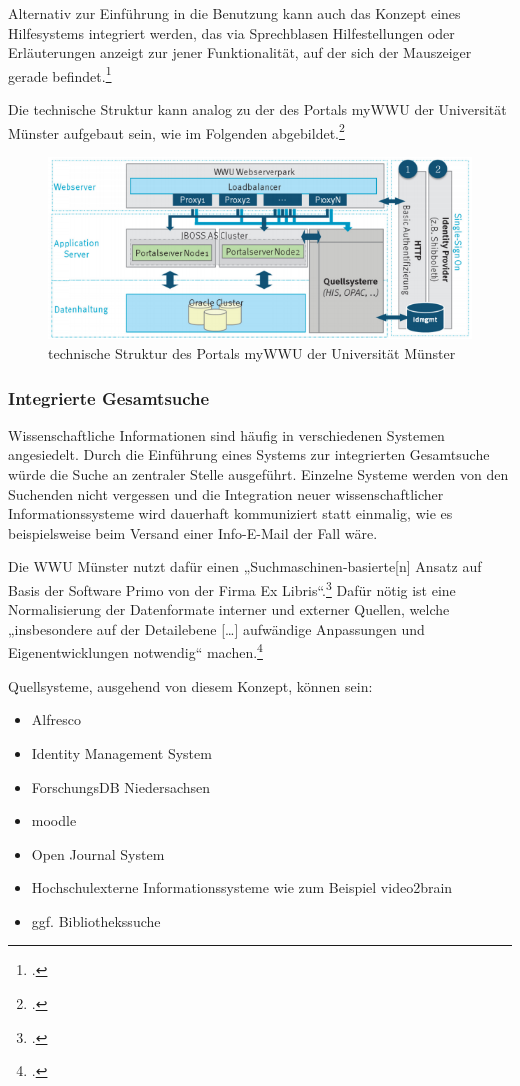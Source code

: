 Alternativ zur Einführung in die Benutzung kann auch das Konzept eines Hilfesystems integriert werden, das via Sprechblasen Hilfestellungen oder Erläuterungen anzeigt zur jener Funktionalität, auf der sich der Mauszeiger gerade befindet.\footcite[Vgl.][22]{vogl_bericht_2013}

Die technische Struktur kann analog zu der des Portals myWWU der Universität Münster aufgebaut sein, wie im Folgenden abgebildet.\footcite[Vgl.][165]{vogl_fortschritte_2012}
\begin{figure}[h!]
	\centering
	\includegraphics[width=\textwidth]{kapitel/gruppe3/bilder/struktur_mywwu}
	\caption{technische Struktur des Portals myWWU der Universität Münster}
	\label{fig_struktur_mywwu}
\end{figure}
\newpage

\subsubsection{Integrierte Gesamtsuche}
\label{subsubsection_integrierte_gesamtsuche}
Wissenschaftliche Informationen sind häufig in verschiedenen Systemen angesiedelt. Durch die Einführung eines Systems zur integrierten Gesamtsuche würde die Suche an zentraler Stelle ausgeführt. Einzelne Systeme werden von den Suchenden nicht vergessen und die Integration neuer wissenschaftlicher Informationssysteme wird dauerhaft kommuniziert statt einmalig, wie es beispielsweise beim 
Versand einer Info-E-Mail der Fall wäre.

Die WWU Münster nutzt dafür einen „Suchmaschinen-basierte[n] Ansatz auf Basis der Software Primo von der Firma Ex Libris“.\footcite[Vgl.][41]{vogl_fortschritte_2012} Dafür nötig ist eine Normalisierung der Datenformate interner und externer Quellen, welche „insbesondere auf der Detailebene […] aufwändige Anpassungen und Eigenentwicklungen notwendig“ machen.\footcite[Vgl.][42]{vogl_fortschritte_2012}

Quellsysteme, ausgehend von diesem Konzept, können sein:
\begin{itemize}
	\item Alfresco
	\item Identity Management System
	\item ForschungsDB Niedersachsen
	\item moodle
	\item Open Journal System
	\item Hochschulexterne Informationssysteme wie zum Beispiel video2brain
	\item ggf. Bibliothekssuche
\end{itemize}

